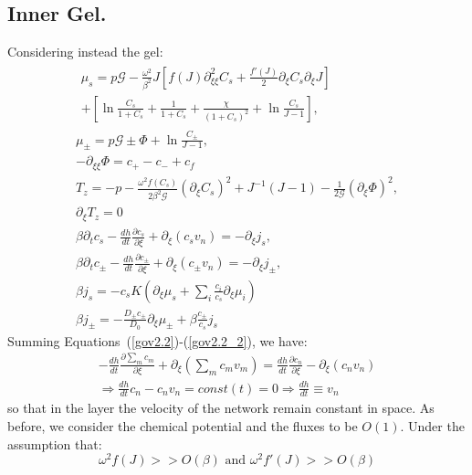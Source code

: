 \documentclass[12pt]{extarticle}
\begin{document}
\subsection{Inner Gel.}
Considering instead the gel:
\begin{gather}
\begin{aligned}
\mu_s = p \mathcal{G} - \frac{\omega^2}{\beta^2} J \left[f(J)\partial_{\xi\xi}^2 C_s+\frac{f'(J)}{2}\partial_\xi C_s\partial_\xi J\right]\\
+ \left[\ln \frac{C_s}{1+C_s} + \frac{1}{1+C_s}+\frac{\chi}{(1+C_s)^2} + \ln \frac{C_s}{J-1} \right], 
\end{aligned}\label{mus2.2}\\[2.5mm]
\mu_\pm = p \mathcal{G} \pm \Phi  + \ln \frac{C_\pm}{J-1} ,\\
-\partial_{\xi\xi} \Phi = c_+-c_-+c_f\,\label{Poi2.2} \\
T_z= -p-\frac{\omega^2 f(C_s)}{2\beta^2\mathcal{G}} (\partial_\xi C_s)^2+ J^{-1}\left(J-1\right)-\frac{1}{2\mathcal{G}} (\partial_\xi \Phi)^2,\label{T2.2}\\
\partial_\xi T_z=0\\
\beta \partial_t c_s -\frac{dh}{dt}\frac{\partial c_s}{\partial \xi}+\partial_\xi (c_s v_n)= - \partial_\xi j_s,\label{gov2.2}\\
\beta \partial_t c_\pm -\frac{dh}{dt}\frac{\partial c_\pm}{\partial \xi}+\partial_\xi (c_\pm v_n)= -\partial_\xi j_\pm,\label{gov2.2_2}\\
\beta j_s =-c_s K  \left(\partial_\xi\mu_s +\sum_i \frac{c_i}{c_s} \partial_\xi \mu_i\right)\\
\beta j_\pm= - \frac{D_\pm c_\pm}{D_0}\partial_\xi \mu_\pm + \beta \frac{c_\pm}{c_s}j_s
\end{gather}
Summing Equations~(\ref{gov2.2})-(\ref{gov2.2_2}), we have:
\begin{equation}
\begin{aligned}
-\frac{dh}{dt}\frac{\partial \sum_m c_m}{\partial \xi}+ \partial_\xi \left(\sum_m c_m v_m\right)= \frac{dh}{dt}\frac{\partial c_n}{\partial \xi}-\partial_\xi (c_n v_n)\\
\Rightarrow  \frac{dh}{dt} c_n -c_n v_n=const(t)=0 \Rightarrow  \frac{dh}{dt} \equiv v_n
\end{aligned}
\end{equation}
so that in the layer the velocity of the network remain constant in space.
\color{red}
As before, we consider the chemical potential and the fluxes to be $O(1)$. Under the assumption that:
\begin{equation}
\omega^2 f(J)>> O(\beta) \text{ and } \omega^2 f'(J)>> O(\beta)
\end{equation}
\end{document}
